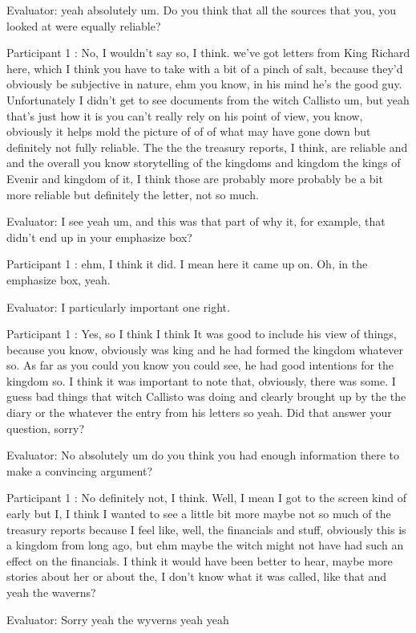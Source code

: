 \documentclass{l4proj}
\begin{document}
\begin{appendices}
Evaluator: yeah absolutely um. Do you think that all the sources that you, you looked at were equally reliable?

Participant 1 : No, I wouldn't say so, I think. we've got letters from King Richard here, which I think you have to take with a bit of a pinch of salt, because they’d obviously be subjective in nature, ehm you know, in his mind he's the good guy. Unfortunately I didn't get to see documents from the witch Callisto um, but yeah that's just how it is you can't really rely on his point of view, you know, obviously it helps mold the picture of of of what may have gone down but definitely not fully reliable. The the the treasury reports, I think, are reliable and and the overall you know storytelling of the kingdoms and kingdom the kings of Evenir and kingdom of it, I think those are probably more probably be a bit more reliable but definitely the letter, not so much.

Evaluator: I see yeah um, and this was that part of why it, for example, that didn't end up in your emphasize box?

Participant 1 : ehm, I think it did. I mean here it came up on. Oh, in the emphasize box, yeah.

Evaluator: I particularly important one right.

Participant 1 : Yes, so I think I think It was good to include his view of things, because you know, obviously was king and he had formed the kingdom whatever so. As far as you could you know you could see, he had good intentions for the kingdom so. I think it was important to note that, obviously, there was some. I guess bad things that witch Callisto was doing and clearly brought up by the the diary or the whatever the entry from his letters so yeah. Did that answer your question, sorry?

Evaluator: No absolutely um do you think you had enough information there to make a convincing argument?

Participant 1 : No definitely not, I think. Well, I mean I got to the screen kind of early but I, I think I wanted to see a little bit more maybe not so much of the treasury reports because I feel like, well, the financials and stuff,  obviously this is a kingdom from long ago, but ehm maybe the witch might not have had such an effect on the financials. I think it would have been better to hear, maybe more stories about her or about the,  I don't know what it was called, like that and yeah the waverns?

Evaluator: Sorry yeah the wyverns yeah yeah


\end{appendices}
\end{document}
